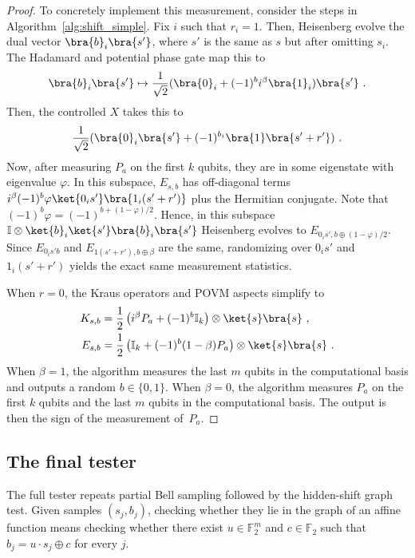 \documentclass[11pt]{article}
\newcommand{\id}{\ensuremath{\mathbb{I}}}
\newcommand{\F}{\mathbb{F}}
\begin{document}
\begin{proof}
    To concretely implement this measurement, consider the steps in Algorithm~\ref{alg:shift_simple}. Fix $i$ such that $r_i = 1$. Then, Heisenberg evolve the dual vector $\bra{b}_i\bra{s'}$, where $s'$ is the same as $s$ but after omitting $s_i$. The Hadamard and potential phase gate map this to
    \begin{align}
        \bra{b}_i\bra{s'} \mapsto \frac{1}{\sqrt{2}}(\bra{0}_i + (-1)^{b}i^\beta \bra{1}_i) \bra{s'}\ .
    \end{align}
    Then, the controlled $X$ takes this to
    \begin{align}
        \frac{1}{\sqrt{2}}(\bra{0}_i\bra{s'} + (-1)^{b_i}\bra{1}\bra{s'+r'})\ .
    \end{align}
    Now, after measuring $P_a$ on the first $k$ qubits, they are in some eigenstate with eigenvalue $\varphi$. In this subspace, $E_{s,b}$ has off-diagonal terms $i^\beta (-1)^b \varphi \ket{0_i s'}\bra{1_i(s'+r')}$ plus the Hermitian conjugate. Note that $(-1)^b \varphi = (-1)^{b+(1-\varphi)/2}$. Hence, in this subspace $\id \otimes \ket{b}_i\ket{s'}\bra{b}_i\bra{s'}$ Heisenberg evolves to $E_{0_is',b \oplus (1-\varphi)/2}$. Since $E_{0_is'b}$ and $E_{1(s'+r'),b\oplus \beta}$ are the same, randomizing over $0_is'$ and $1_i (s'+r')$ yields the exact same measurement statistics.

    When $r=0$, the Kraus operators and POVM aspects simplify to
    \begin{align}
        K_{s,b} & = \frac{1}{2}\left( i^\beta P_a +(-1)^b \id_k \right) \otimes \ket{s}\bra{s}\ ,\\
        E_{s,b} & = \frac{1}{2}\left(\id_k + (-1)^b (1-\beta) P_a \right)\otimes \ket{s}\bra{s}\ .
    \end{align}
    When $\beta = 1$, the algorithm  measures the last $m$ qubits in the computational basis and outputs a random $b \in \{0,1\}$. When $\beta = 0$, the algorithm measures $P_a$ on the first $k$ qubits and the last $m$ qubits in the computational basis. The output is then the sign of the measurement of~$P_a$.
\end{proof}

\subsection{The final tester}\label{sec:stab_test_full}

The full tester repeats partial Bell sampling followed by the hidden-shift
graph test.  Given samples $(s_j,b_j)$, checking whether they lie in the graph
of an affine function means checking whether there exist $u\in\F_2^m$ and
$c\in\F_2$ such that $b_j=u\cdot s_j\oplus c$ for every $j$.
\end{document}

